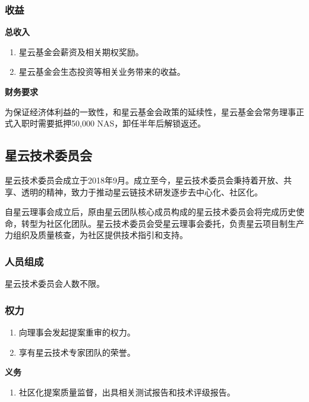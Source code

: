 \subsubsection{收益}

\textbf{总收入}

\begin{enumerate}
	\item 星云基金会薪资及相关期权奖励。
    \item 星云基金会生态投资等相关业务带来的收益。
\end{enumerate}

\vspace{2em}

\textbf{财务要求}

为保证经济体利益的一致性，和星云基金会政策的延续性，星云基金会常务理事正式入职时需要抵押50,000 NAS，卸任半年后解锁返还。

\subsection{星云技术委员会}

星云技术委员会成立于2018年9月。成立至今，星云技术委员会秉持着开放、共享、透明的精神，致力于推动星云链技术研发逐步去中心化、社区化。

自星云理事会成立后，原由星云团队核心成员构成的星云技术委员会将完成历史使命，转型为社区化团队。星云技术委员会受星云理事会委托，负责星云项目制生产力组织及质量核查，为社区提供技术指引和支持。

\subsubsection{人员组成}

星云技术委员会人数不限。

\subsubsection{权力}

\begin{enumerate}
	\item 向理事会发起提案重审的权力。
	\item 享有星云技术专家团队的荣誉。
\end{enumerate}

\textbf{义务}

\begin{enumerate}
	\item 社区化提案质量监督，出具相关测试报告和技术评级报告。
\end{enumerate}

